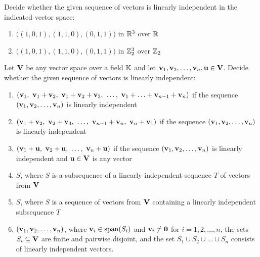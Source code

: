 \begin{exercise}
Decide whether the given sequence of vectors is linearly independent in the indicated vector space:
\begin{enumerate}[label=(\alph*)]
\item $\big((1,0,1),(1,1,0),(0,1,1)\big)$ in $\mathbb{R}^3$ over $\mathbb{R}$
\item $\big((1,0,1),(1,1,0),(0,1,1)\big)$ in $\mathbb{Z}_2^3$ over $\mathbb{Z}_2$
\end{enumerate}
\end{exercise}

\begin{exercise}
Let $\mathbf{V}$ be any vector space over a field $\mathbb{K}$ and let $\mathbf{v}_1,\mathbf{v}_2,\ldots,\mathbf{v}_n,\mathbf{u} \in \mathbf{V}$. Decide
whether the given sequence of vectors is linearly independent:
\begin{enumerate}[label=(\alph*)]
\item $(\vv_1,\ \vv_1+\vv_2,\ \vv_1+\vv_2+\vv_3,\ \ldots,\ \vv_1+\ldots+\vv_{n-1}+\vv_n)$ if the sequence
$(\mathbf{v}_1,\mathbf{v}_2,\ldots,\mathbf{v}_n)$ is linearly independent
\item $(\vv_1+\vv_2,\ \vv_2+\vv_3,\ \ldots,\ \vv_{n-1}+\vv_n,\ \vv_n+\vv_1)$ if the sequence
$(\mathbf{v}_1,\mathbf{v}_2,\ldots,\mathbf{v}_n)$ is linearly independent
\item $(\vv_1+\uu,\ \vv_2+\uu,\ \ldots,\ \vv_n+\uu)$ if the sequence $(\mathbf{v}_1,\mathbf{v}_2,\ldots,\mathbf{v}_n)$ is
linearly independent and $\mathbf{u}\in \mathbf{V}$ is any vector
\item $S$, where $S$ is a subsequence of a linearly independent sequence $T$ of vectors from $\mathbf{V}$
\item $S$, where $S$ is a sequence of vectors from $\mathbf{V}$ containing a linearly independent subsequence $T$
\item $(\mathbf{v}_1,\mathbf{v}_2,\ldots,\mathbf{v}_n)$, where $\mathbf{v}_i\in\operatorname{span}\!\left(S_i\right)$ and $\mathbf{v}_i\neq \mathbf{0}$ for
$i = 1,2,\ldots,n$, the sets $S_i\subseteq \mathbf{V}$ are finite and pairwise disjoint, and the set
$S_1\cup S_2\cup\ldots\cup S_n$ consists of linearly independent vectors.
\end{enumerate}
\end{exercise}

